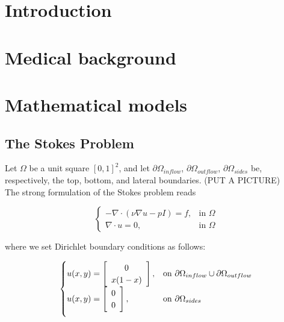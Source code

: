 \documentclass[11pt,a4paper,titlepage]{report}
\begin{document}

\tableofcontents 
{}

\newpage


\chapter{Introduction}

\chapter{Medical background}

\chapter{Mathematical models}

\section{The Stokes Problem}
Let $\Omega$ be a unit square $[0,1]^2$, and let  $\partial \Omega_{inflow}$, $\partial \Omega_{outflow}$, $\partial \Omega_{sides}$ be, respectively, the top, bottom, and lateral boundaries. (PUT A PICTURE) \\
The strong formulation of the Stokes problem reads

\[
\begin{cases}
- \nabla \cdot (\nu \nabla u - pI) = f, & \mbox{in } \Omega \\
\nabla \cdot u = 0, & \mbox{in } \Omega
\end{cases}
\]

where we set Dirichlet boundary conditions as follows:

\[
\begin{cases}
u(x,y) = \left[ \begin{array}{c} 0 \\ x(1-x) \end{array} \right] , & \mbox{on } \partial \Omega_{inflow} \cup \partial \Omega_{outflow} \\

\vspace{.2cm}

u(x,y) = \left[ \begin{array}{c} 0 \\ 0 \end{array} \right], & \mbox{on } \partial \Omega_{sides}
\end{cases}
\]
\end{document}
